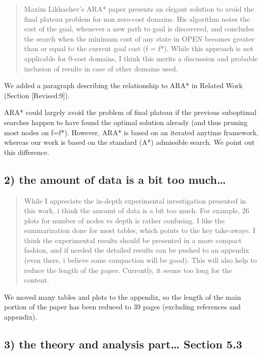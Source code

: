 \documentclass{article}
\begin{document}
\begin{quote}
 Maxim Likhachev's ARA* paper presents an elegant solution to
avoid the final plateau problem for non zero-cost domains. His
algorithm notes the cost of the goal, whenever a new path to goal is
discovered, and concludes the search when the minimum cost of any
state in OPEN becomes greater than or equal to the current goal cost
(f = f*). While this approach is not applicable for 0-cost domains, I
think this merits a discussion and probable inclusion of results in
case of other domains used.
\end{quote}

We added a paragraph describing the relationship to ARA* in Related Work (Section [Revised:9]).

ARA* could largely avoid the problem of final plateau if the previous suboptimal searches happen to
have found the optimal solution already (and thus pruning most nodes on f=f*). 
However, ARA* is based on an iterated anytime framework, whereas our work is based on the standard (A*) admissible search.
We point out this difference.


\subsection{2) the amount of data is a bit too much\ldots{}}
\label{sec:orgheadline15}

\begin{quote}
 While I appreciate the in-depth experimental investigation
presented in this work, i think the amount of data is a bit too much.
For example, 26 plots for number of nodes vs depth is rather
confusing. I like the summarization done for most tables, which points
to the key take-aways. I think the experimental results should be
presented in a more compact fashion, and if needed the detailed
results can be pushed to an appendix (even there, i believe some
compaction will be good). This will also help to reduce the length of
the paper. Currently, it seems too long for the content.
\end{quote}

We moved many tables and plots to the appendix, so the length of the main portion of the paper has been reduced to 39 pages (excluding references and appendix).

\subsection{\label{orgtarget1} 3) the theory and analysis part\ldots{} Section 5.3}
\label{sec:orgheadline16}
\end{document}
